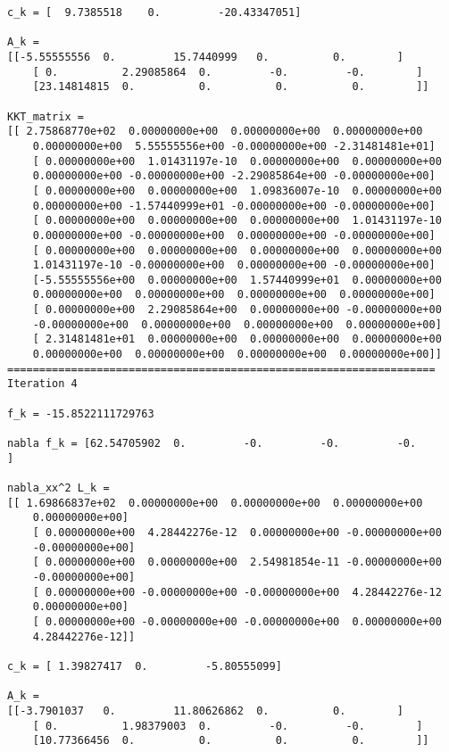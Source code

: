 \documentclass{article}
\begin{document}
\begin{verbatim}
c_k = [  9.7385518    0.         -20.43347051]

A_k = 
[[-5.55555556  0.         15.7440999   0.          0.        ]
    [ 0.          2.29085864  0.         -0.         -0.        ]
    [23.14814815  0.          0.          0.          0.        ]]

KKT_matrix = 
[[ 2.75868770e+02  0.00000000e+00  0.00000000e+00  0.00000000e+00
    0.00000000e+00  5.55555556e+00 -0.00000000e+00 -2.31481481e+01]
    [ 0.00000000e+00  1.01431197e-10  0.00000000e+00  0.00000000e+00
    0.00000000e+00 -0.00000000e+00 -2.29085864e+00 -0.00000000e+00]
    [ 0.00000000e+00  0.00000000e+00  1.09836007e-10  0.00000000e+00
    0.00000000e+00 -1.57440999e+01 -0.00000000e+00 -0.00000000e+00]
    [ 0.00000000e+00  0.00000000e+00  0.00000000e+00  1.01431197e-10
    0.00000000e+00 -0.00000000e+00  0.00000000e+00 -0.00000000e+00]
    [ 0.00000000e+00  0.00000000e+00  0.00000000e+00  0.00000000e+00
    1.01431197e-10 -0.00000000e+00  0.00000000e+00 -0.00000000e+00]
    [-5.55555556e+00  0.00000000e+00  1.57440999e+01  0.00000000e+00
    0.00000000e+00  0.00000000e+00  0.00000000e+00  0.00000000e+00]
    [ 0.00000000e+00  2.29085864e+00  0.00000000e+00 -0.00000000e+00
    -0.00000000e+00  0.00000000e+00  0.00000000e+00  0.00000000e+00]
    [ 2.31481481e+01  0.00000000e+00  0.00000000e+00  0.00000000e+00
    0.00000000e+00  0.00000000e+00  0.00000000e+00  0.00000000e+00]]
===================================================================
Iteration 4

f_k = -15.8522111729763

nabla f_k = [62.54705902  0.         -0.         -0.         -0.        ]

nabla_xx^2 L_k = 
[[ 1.69866837e+02  0.00000000e+00  0.00000000e+00  0.00000000e+00
    0.00000000e+00]
    [ 0.00000000e+00  4.28442276e-12  0.00000000e+00 -0.00000000e+00
    -0.00000000e+00]
    [ 0.00000000e+00  0.00000000e+00  2.54981854e-11 -0.00000000e+00
    -0.00000000e+00]
    [ 0.00000000e+00 -0.00000000e+00 -0.00000000e+00  4.28442276e-12
    0.00000000e+00]
    [ 0.00000000e+00 -0.00000000e+00 -0.00000000e+00  0.00000000e+00
    4.28442276e-12]]

c_k = [ 1.39827417  0.         -5.80555099]

A_k = 
[[-3.7901037   0.         11.80626862  0.          0.        ]
    [ 0.          1.98379003  0.         -0.         -0.        ]
    [10.77366456  0.          0.          0.          0.        ]]


\end{verbatim}
\end{document}
